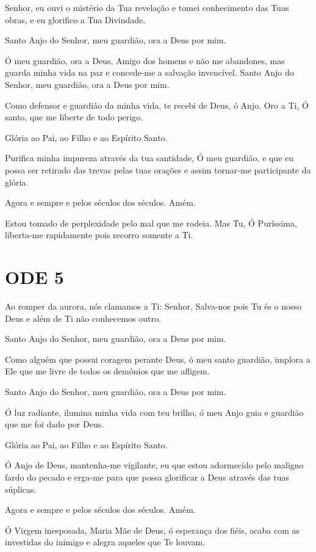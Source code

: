 \documentclass{subfiles}
\begin{document}
\eirmos{}Senhor, eu ouvi o mistério da Tua revelação e tomei conhecimento das
Tuas obras, e eu glorifico a Tua Divindade.

Santo Anjo do Senhor, meu guardião, ora a Deus por mim.

Ó meu guardião, ora a Deus, Amigo dos homens e não me abandones,
mas guarda minha vida na paz e concede-me a salvação invencível.
Santo Anjo do Senhor, meu guardião, ora a Deus por mim.

Como defensor e guardião da minha vida, te recebi de Deus, ó Anjo.
Oro a Ti, Ó santo, que me liberte de todo perigo.

Glória ao Pai, ao Filho e ao Espírito Santo.

Purifica minha impureza através da tua santidade, Ó meu guardião, e
que eu possa ser retirado das trevas pelas tuas orações e assim tornar-me
participante da glória.

Agora e sempre e pelos séculos dos séculos. Amém.

Estou tomado de perplexidade pelo mal que me rodeia. Mas Tu, Ó
Puríssima, liberta-me rapidamente pois recorro somente a Ti.

\section{ODE 5}

\eirmos{}Ao romper da aurora, nós clamamos a Ti: Senhor, Salva-nos pois Tu és
o nosso Deus e além de Ti não conhecemos outro.

Santo Anjo do Senhor, meu guardião, ora a Deus por mim.

Como alguém que possui coragem perante Deus, ó meu santo
guardião, implora a Ele que me livre de todos os demônios que me afligem.

Santo Anjo do Senhor, meu guardião, ora a Deus por mim.

Ó luz radiante, ilumina minha vida com teu brilho, ó meu Anjo guia e
guardião que me foi dado por Deus.

Glória ao Pai, ao Filho e ao Espírito Santo.

Ó Anjo de Deus, mantenha-me vigilante, eu que estou adormecido
pelo maligno fardo do pecado e erga-me para que possa glorificar a Deus
através das tuas súplicas.

Agora e sempre e pelos séculos dos séculos. Amém.

Ó Virgem inesposada, Maria Mãe de Deus, ó esperança dos fiéis, acaba
com as investidas do inimigo e alegra aqueles que Te louvam.
\end{document}
